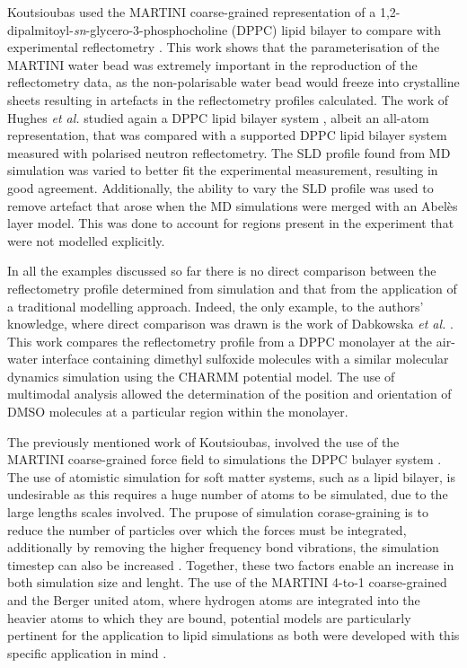 Koutsioubas used the MARTINI coarse-grained representation of a 1,2-dipalmitoyl-\emph{sn}-glycero-3-phosphocholine (DPPC) lipid bilayer to compare with experimental reflectometry \cite{koutsioubas_combined_2016}.
This work shows that the parameterisation of the MARTINI water bead was extremely important in the reproduction of the reflectometry data, as the non-polarisable water bead would freeze into crystalline sheets resulting in artefacts in the reflectometry profiles calculated.
The work of Hughes \emph{et al.} studied again a DPPC lipid bilayer system \cite{hughes_interpretation_2016}, albeit an all-atom representation, that was compared with a supported DPPC lipid bilayer system measured with polarised neutron reflectometry.
The SLD profile found from MD simulation was varied to better fit the experimental measurement, resulting in good agreement.
Additionally, the ability to vary the SLD profile was used to remove artefact that arose when the MD simulations were merged with an Abel\`{e}s layer model.
This was done to account for regions present in the experiment that were not modelled explicitly.

In all the examples discussed so far there is no direct comparison between the reflectometry profile determined from simulation and that from the application of a traditional modelling approach.
Indeed, the only example, to the authors' knowledge, where direct comparison was drawn is the work of Dabkowska \emph{et al.} \cite{dabkowska_modulation_2014}.
This work compares the reflectometry profile from a DPPC monolayer at the air-water interface containing dimethyl sulfoxide molecules with a similar molecular dynamics simulation using the CHARMM potential model.
The use of multimodal analysis allowed the determination of the position and orientation of DMSO molecules at a particular region within the monolayer.

The previously mentioned work of Koutsioubas, involved the use of the MARTINI coarse-grained force field to simulations the DPPC bulayer system \cite{koutsioubas_combined_2016}.
The use of atomistic simulation for soft matter systems, such as a lipid bilayer, is undesirable as this requires a huge number of atoms to be simulated, due to the large lengths scales involved.
The prupose of simulation corase-graining is to reduce the number of particles over which the forces must be integrated, additionally by removing the higher frequency bond vibrations, the simulation timestep can also be increased \cite{pluhackova_biomembranes_2015}.
Together, these two factors enable an increase in both simulation size and lenght.
The use of the MARTINI 4-to-1 coarse-grained and the Berger united atom, where hydrogen atoms are integrated into the heavier atoms to which they are bound, potential models are particularly pertinent for the application to lipid simulations as both were developed with this specific application in mind \cite{marrink_martini_2007,berger_molecular_1997}.

